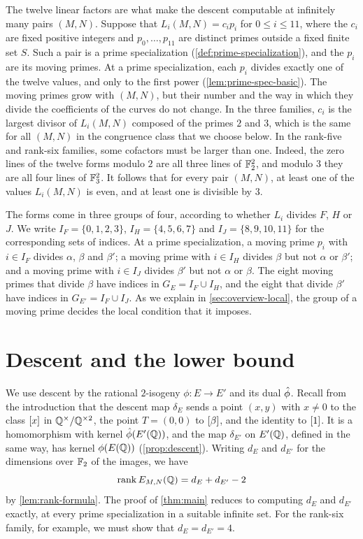 The twelve linear factors are what make the descent computable at infinitely many pairs $(M,N)$. Suppose that $L_i(M,N)=c_ip_i$ for $0\le i\le11$, where the $c_i$ are fixed positive integers and $p_0,\dots,p_{11}$ are distinct primes outside a fixed finite set $S$. Such a pair is a prime specialization (\cref{def:prime-specialization}), and the $p_i$ are its moving primes. At a prime specialization, each $p_i$ divides exactly one of the twelve values, and only to the first power (\cref{lem:prime-spec-basic}). The moving primes grow with $(M,N)$, but their number and the way in which they divide the coefficients of the curves do not change. In the three families, $c_i$ is the largest divisor of $L_i(M,N)$ composed of the primes $2$ and $3$, which is the same for all $(M,N)$ in the congruence class that we choose below. In the rank-five and rank-six families, some cofactors must be larger than one. Indeed, the zero lines of the twelve forms modulo $2$ are all three lines of $\mathbb F_2^2$, and modulo $3$ they are all four lines of $\mathbb F_3^2$. It follows that for every pair $(M,N)$, at least one of the values $L_i(M,N)$ is even, and at least one is divisible by $3$.

The forms come in three groups of four, according to whether $L_i$ divides $F$, $H$ or $J$. We write $I_F=\{0,1,2,3\}$, $I_H=\{4,5,6,7\}$ and $I_J=\{8,9,10,11\}$ for the corresponding sets of indices. At a prime specialization, a moving prime $p_i$ with $i\in I_F$ divides $\alpha$, $\beta$ and $\beta'$; a moving prime with $i\in I_H$ divides $\beta$ but not $\alpha$ or $\beta'$; and a moving prime with $i\in I_J$ divides $\beta'$ but not $\alpha$ or $\beta$. The eight moving primes that divide $\beta$ have indices in $G_E=I_F\cup I_H$, and the eight that divide $\beta'$ have indices in $G_{E'}=I_F\cup I_J$. As we explain in \cref{sec:overview-local}, the group of a moving prime decides the local condition that it imposes.

\section{Descent and the lower bound}\label{sec:overview-descent}

We use descent by the rational $2$-isogeny $\phi\colon E\to E'$ and its dual $\hat\phi$. Recall from the introduction that the descent map $\delta_E$ sends a point $(x,y)$ with $x\ne0$ to the class $[x]$ in $\mathbb Q^{\times}/\mathbb Q^{\times2}$, the point $T=(0,0)$ to $[\beta]$, and the identity to $[1]$. It is a homomorphism with kernel $\hat\phi(E'(\mathbb Q))$, and the map $\delta_{E'}$ on $E'(\mathbb Q)$, defined in the same way, has kernel $\phi(E(\mathbb Q))$ (\cref{prop:descent}). Writing $d_E$ and $d_{E'}$ for the dimensions over $\mathbb F_2$ of the images, we have
\begin{equation*}
\operatorname{rank} E_{M,N}(\mathbb Q)=d_E+d_{E'}-2
\end{equation*}
by \cref{lem:rank-formula}. The proof of \cref{thm:main} reduces to computing $d_E$ and $d_{E'}$ exactly, at every prime specialization in a suitable infinite set. For the rank-six family, for example, we must show that $d_E=d_{E'}=4$.

